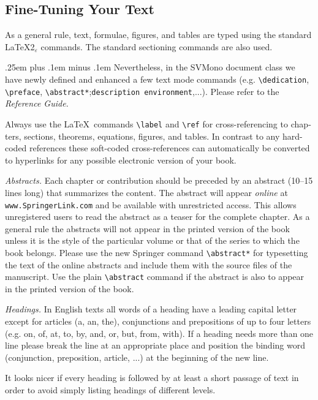 \documentclass[graybox]{svmono}
\begin{document}

\subsection{Fine-Tuning Your Text}

 As a general rule, text, formulae, figures, and tables are typed using the standard \LaTeX2$_\varepsilon$ commands. The standard sectioning commands are also used.

{\spaceskip .25em plus .1em minus .1em Nevertheless, in the {\sc SVMono} document class we have newly defined and en­hanced a few text mode commands (e.g. \verb|\dedication|, \verb|\preface|, \verb|\abstract*|;\break \verb|description environment|,...). Please refer to the {\it Reference Guide.}}

Always use the \LaTeX~commands \verb|\label| and \verb|\ref| for cross-referencing to chap­ters, sections, theorems, equations, figures, and tables. In contrast to any hard-coded references these soft-coded cross-references can automatically be con­verted to hyperlinks for any possible electronic version of your book.

{\it Abstracts.} Each chapter or contribution should be preceded by an abstract (10--15 lines long) that summarizes the content. The abstract will appear {\it online} at {\tt www.SpringerLink.com} and be available with unrestricted access. This allows unregistered users to read the abstract as a teaser for the complete chapter. As a general rule the abstracts will not appear in the printed version of the book unless it is the style of the particular volume or that of the series to which the book belongs. Please use the new Springer command \verb|\abstract*| for typesetting the text of the online abstracts and include them with the source files of the manuscript. Use the plain \verb|\abstract| command if the abstract is also to appear in the printed version of the book.

{\it Headings.} In English texts all words of a heading have a leading capital letter except for articles (a, an, the), conjunctions and prepositions of up to four letters (e.g. on, of, at, to, by, and, or, but, from, with). If a heading needs more than one line please break the line at an appropriate place and position the binding word (conjunction, preposition, article, ...) at the beginning of the new line.

It looks nicer if every heading is followed by at least a short passage of text in order to avoid simply listing headings of different levels.
\end{document}
